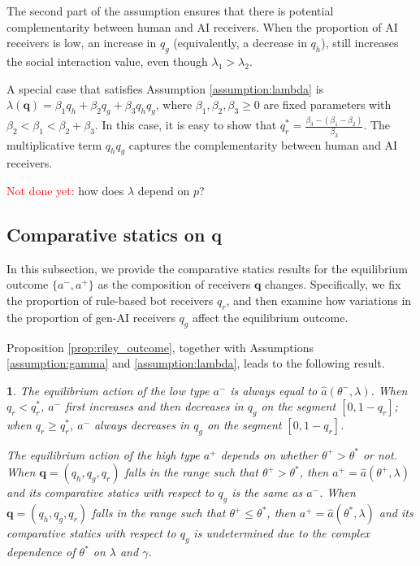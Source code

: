 \documentclass[english,12pt]{article}
\theoremstyle{plain}
\theoremstyle{plain}
\theoremstyle{definition}
\theoremstyle{definition}
\theoremstyle{assumption}
\theoremstyle{plain}
\theoremstyle{plain}
\theoremstyle{plain}
\newtheorem{proposition}{\protect\propositionname}
\theoremstyle{plain}
\theoremstyle{definition}%
\theoremstyle{plain}
\theoremstyle{plain}
\theoremstyle{plain}
\theoremstyle{plain}
\theoremstyle{plain}
\providecommand{\propositionname}{Proposition}
\begin{document}
The second part of the assumption ensures that there is potential complementarity between human and AI receivers. When the proportion of AI receivers is low, an increase in $q_g$ (equivalently, a decrease in $q_h$), still increases the social interaction value, even though $\lambda_1>\lambda_2$.

A special case that satisfies Assumption \ref{assumption:lambda} is $\lambda(\bm{q}) = \beta_1q_h+\beta_2q_g + \beta_3q_hq_g$, where $\beta_1,\beta_2,\beta_3\geq 0$ are fixed parameters with $\beta_2<\beta_1<\beta_2+\beta_3$. In this case, it is easy to show that $q_r^* = \frac{\beta_3-(\beta_1-\beta_2)}{\beta_3}$. The multiplicative term $q_h q_g$ captures the complementarity between human and AI receivers.



\textcolor{red}{Not done yet:} how does $\lambda$ depend on $p$? 


\subsection{Comparative statics on \texorpdfstring{$\bm{q}$}{q}}

In this subsection, we provide the comparative statics results for the equilibrium outcome $\{a^-,a^+\}$ as the composition of receivers $\bm{q}$ changes. Specifically, we fix the proportion of rule-based bot receivers $q_r$, and then examine how variations in the proportion of gen-AI receivers $q_g$ affect the equilibrium outcome.


Proposition \ref{prop:riley_outcome}, together with Assumptions \ref{assumption:gamma} and \ref{assumption:lambda}, leads to the following result.

\begin{proposition}
    The equilibrium action of the low type $a^-$ is always equal to $\hat{a}(\theta^-,\lambda)$. When $q_r<q_r^*$, $a^-$ first increases and then decreases in $q_g$ on the segment $[0,1-q_r]$; when $q_r\geq q_r^*$, $a^-$ always decreases in $q_g$ on the segment $[0,1-q_r]$.

    The equilibrium action of the high type $a^+$ depends on whether $\theta^+>\theta^*$ or not. When $\bm{q}=(q_h,q_g,q_r)$ falls in the range such that $\theta^+>\theta^*$, then $a^+ = \hat{a}(\theta^+,\lambda)$ and its comparative statics with respect to $q_g$ is the same as $a^-$. When $\bm{q}=(q_h,q_g,q_r)$ falls in the range such that $\theta^+\leq\theta^*$, then $a^+ = \hat{a}(\theta^*,\lambda)$ and its comparative statics with respect to $q_g$ is undetermined due to the complex dependence of $\theta^*$ on $\lambda$ and $\gamma$.
\end{proposition}
\end{document}
